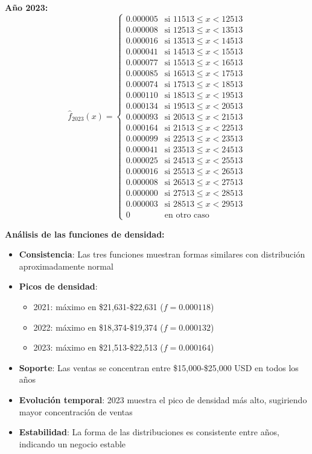 \documentclass[11pt,a4paper]{article}
\begin{document}
\textbf{Año 2023:}
\[
\hat{f}_{2023}(x) = \begin{cases}
0.000005 & \text{si } 11513 \leq x < 12513 \\
0.000008 & \text{si } 12513 \leq x < 13513 \\
0.000016 & \text{si } 13513 \leq x < 14513 \\
0.000041 & \text{si } 14513 \leq x < 15513 \\
0.000077 & \text{si } 15513 \leq x < 16513 \\
0.000085 & \text{si } 16513 \leq x < 17513 \\
0.000074 & \text{si } 17513 \leq x < 18513 \\
0.000110 & \text{si } 18513 \leq x < 19513 \\
0.000134 & \text{si } 19513 \leq x < 20513 \\
0.000093 & \text{si } 20513 \leq x < 21513 \\
0.000164 & \text{si } 21513 \leq x < 22513 \\
0.000099 & \text{si } 22513 \leq x < 23513 \\
0.000041 & \text{si } 23513 \leq x < 24513 \\
0.000025 & \text{si } 24513 \leq x < 25513 \\
0.000016 & \text{si } 25513 \leq x < 26513 \\
0.000008 & \text{si } 26513 \leq x < 27513 \\
0.000000 & \text{si } 27513 \leq x < 28513 \\
0.000003 & \text{si } 28513 \leq x < 29513 \\
0 & \text{en otro caso}
\end{cases}
\]

\textbf{Análisis de las funciones de densidad:}
\begin{itemize}
    \item \textbf{Consistencia}: Las tres funciones muestran formas similares con distribución aproximadamente normal
    \item \textbf{Picos de densidad}: 
    \begin{itemize}
        \item 2021: máximo en \$21,631-\$22,631 ($f = 0.000118$)
        \item 2022: máximo en \$18,374-\$19,374 ($f = 0.000132$)
        \item 2023: máximo en \$21,513-\$22,513 ($f = 0.000164$)
    \end{itemize}
    \item \textbf{Soporte}: Las ventas se concentran entre \$15,000-\$25,000 USD en todos los años
    \item \textbf{Evolución temporal}: 2023 muestra el pico de densidad más alto, sugiriendo mayor concentración de ventas
    \item \textbf{Estabilidad}: La forma de las distribuciones es consistente entre años, indicando un negocio estable
\end{itemize}
\end{document}
